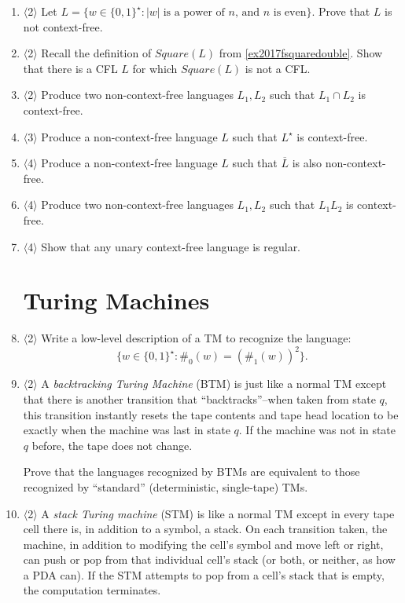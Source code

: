 \documentclass[]{article}
\newcommand{\Level}[1]{{\color{blue} $\langle$#1$\rangle$}}
\begin{document}
\begin{enumerate}
\item \Level{2} Let $L = \{w \in \{0, 1\}^\star : |w|\;\text{is a power of $n$, and $n$ is even}\}$. Prove that $L$ is not context-free.

\item \Level{2} Recall the definition of $Square(L)$ from \cref{ex2017fsquaredouble}. 
	Show that there is a CFL $L$ for which $Square(L)$ is not a CFL.

\item \Level{2} Produce two non-context-free languages $L_1, L_2$ such that $L_1 \cap L_2$ is context-free.

\item \Level{3} Produce a non-context-free language $L$ such that $L^\star$ is context-free.

\item \Level{4} Produce a non-context-free language $L$ such that $\overline{L}$ is also non-context-free.

\item \Level{4} Produce two non-context-free languages $L_1, L_2$ such that $L_1 L_2$ is context-free.

\item \Level{4} Show that any unary context-free language is regular.

\section{Turing Machines}

\item \Level{2} Write a low-level description of a TM to recognize the language:
\[
\{w \in \{0, 1\}^\star : \#_0(w) = (\#_1(w))^2 \}.
\]

\item \Level{2} A \textit{backtracking Turing Machine} (BTM) is just like a normal TM except that there is another transition that ``backtracks''--when taken from state $q$, this transition instantly resets the tape contents and tape head location to be exactly when the machine was last in state $q$. If the machine was not in state $q$ before, the tape does not change.

Prove that the languages recognized by BTMs are equivalent to those recognized by ``standard'' (deterministic, single-tape) TMs.

\item \Level{2} A \textit{stack Turing machine} (STM) is like a normal TM except in every tape cell there is, in addition to a symbol, a stack. On each transition taken, the machine, in addition to modifying the cell's symbol and move left or right, can push or pop from that individual cell's stack (or both, or neither, as how a PDA can). If the STM attempts to pop from a cell's stack that is empty, the computation terminates.


\end{enumerate}
\end{document}
